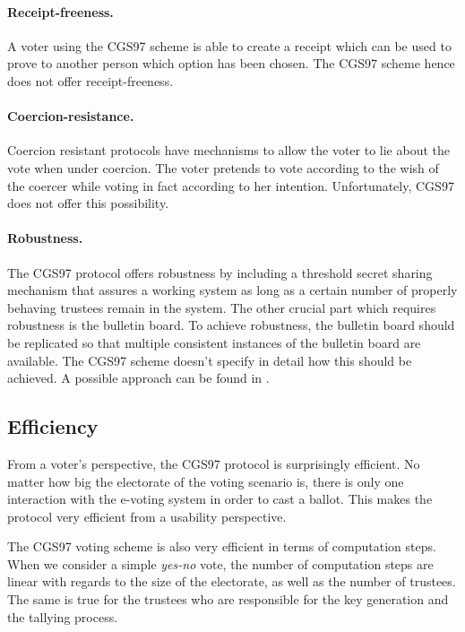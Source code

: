 \documentclass[numbers=noenddot, abstract=on, a4paper, headsepline,
footsepline, oneside, openright, draft=off, listof=leveldown]{scrreprt}
\begin{document}
\paragraph{Receipt-freeness.} A voter using the CGS97 scheme is able to create a
receipt which can be used to prove to another person which option has been
chosen. The CGS97 scheme hence does not offer receipt-freeness.

\paragraph{Coercion-resistance.} Coercion resistant protocols have mechanisms
to allow the voter to lie about the vote when under coercion. The voter pretends
to vote according to the wish of the coercer while voting in fact according to
her intention. Unfortunately, CGS97 does not offer this possibility.

\paragraph{Robustness.} The CGS97 protocol offers robustness by including a
threshold secret sharing mechanism that assures a working system as long as a
certain number of properly behaving trustees remain in the system. The other
crucial part which requires robustness is the bulletin board. To achieve
robustness, the bulletin board should be replicated so that multiple consistent
instances of the bulletin board are available. The CGS97 scheme doesn't specify
in detail how this should be achieved. A possible approach can be found in \cite{HL09}.

\subsection{Efficiency}
\label{sec:efficiencyproperties}
From a voter's perspective, the CGS97 protocol is surprisingly efficient. No
matter how big the electorate of the voting scenario is, there is only one
interaction with the e-voting system in order to cast a ballot. This makes the
protocol very efficient from a usability perspective.

The CGS97 voting scheme is also very efficient in terms of computation steps.
When we consider a simple \emph{yes-no} vote, the number of computation steps
are linear with regards to the size of the electorate, as well as the number of
trustees. The same is true for the trustees who are responsible for the key
generation and the tallying process.
\end{document}
